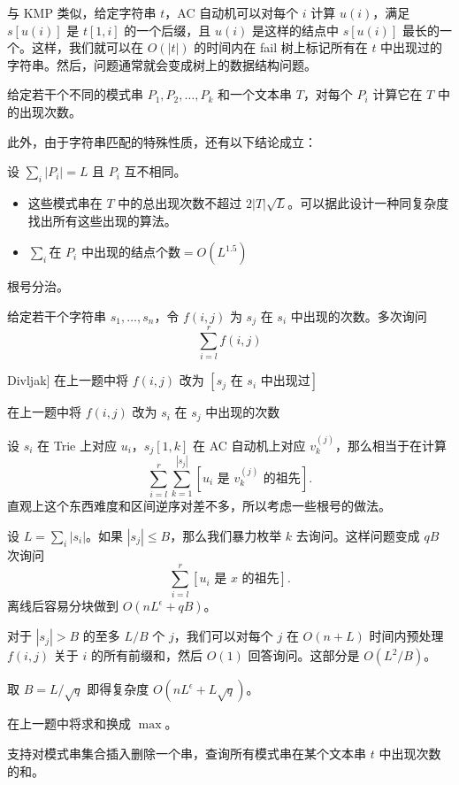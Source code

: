 与 KMP 类似，给定字符串 $t$，AC 自动机可以对每个 $i$ 计算 $u(i)$，满足 $s[u(i)]$ 是 $t[1,i]$ 的一个后缀，且 $u(i)$ 是这样的结点中 $s[u(i)]$ 最长的一个。这样，我们就可以在 $O(|t|)$ 的时间内在 fail 树上标记所有在 $t$ 中出现过的字符串。然后，问题通常就会变成树上的数据结构问题。

\begin{exercise}[模板题]
    给定若干个不同的模式串 $P_1,P_2,\ldots,P_k$ 和一个文本串 $T$，对每个 $P_i$ 计算它在 $T$ 中的出现次数。
\end{exercise}
此外，由于字符串匹配的特殊性质，还有以下结论成立：
\begin{property}
    设 $\sum_i |P_i|=L$ 且 $P_i$ 互不相同。
    \begin{itemize}
        \item 这些模式串在 $T$ 中的总出现次数不超过 $2|T|\sqrt{L}$。可以据此设计一种同复杂度找出所有这些出现的算法。
        \item $\sum_i \text{在 }P_i\text{ 中出现的结点个数}=O(L^{1.5})$
    \end{itemize}
    \begin{hint}
        根号分治。
    \end{hint}
\end{property}

\begin{exercise}
    给定若干个字符串 $s_1,\ldots,s_n$，令 $f(i,j)$ 为 $s_j$ 在 $s_i$ 中出现的次数。多次询问
    $$
    \sum_{i=l}^r f(i,j)
    $$
\end{exercise}
\begin{exercise}[P5840 [COCI 2014/2015 \#5] Divljak]
    在上一题中将 $f(i,j)$ 改为 $[s_j\text{ 在 }s_i\text{ 中出现过}]$
\end{exercise}
\begin{exercise}
    在上一题中将 $f(i,j)$ 改为 $s_i$ 在 $s_j$ 中出现的次数
\end{exercise}
\begin{solution}
    设 $s_i$ 在 Trie 上对应 $u_i$，$s_j[1,k]$ 在 AC 自动机上对应 $v_{k}^{(j)}$，那么相当于在计算
    $$
    \sum_{i=l}^r \sum_{k=1}^{|s_j|} [u_i\text{ 是 }v_{k}^{(j)}\text{ 的祖先}].
    $$
    直观上这个东西难度和区间逆序对差不多，所以考虑一些根号的做法。

    设 $L=\sum_i |s_i|$。如果 $|s_j|\le B$，那么我们暴力枚举 $k$ 去询问。这样问题变成 $qB$ 次询问
    $$
    \sum_{i=l}^r [u_i\text{ 是 }x\text{ 的祖先}].
    $$
    离线后容易分块做到 $O(nL^{\epsilon}+qB)$。

    对于 $|s_j|>B$ 的至多 $L/B$ 个 $j$，我们可以对每个 $j$ 在 $O(n+L)$ 时间内预处理 $f(i,j)$ 关于 $i$ 的所有前缀和，然后 $O(1)$ 回答询问。这部分是 $O(L^2/B)$。

    取 $B=L/\sqrt{q}$ 即得复杂度 $O(nL^{\epsilon}+L\sqrt{q})$。
\end{solution}
\begin{exercise}[{[JRKSJ R6] Dedicatus545}]
    在上一题中将求和换成 $\max$。
\end{exercise}
\begin{exercise}
    支持对模式串集合插入删除一个串，查询所有模式串在某个文本串 $t$ 中出现次数的和。
\end{exercise}

